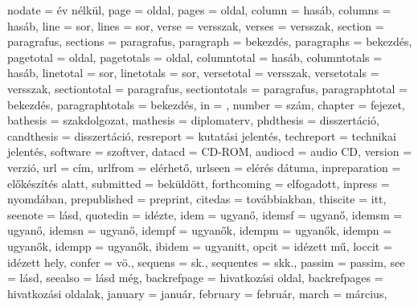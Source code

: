 {		nodate           = {\'ev n\'elk\"ul},
		page             = {oldal},
		pages            = {oldal},
		column           = {has\'ab},
		columns          = {has\'ab},
		line             = {sor},
		lines            = {sor},
		verse            = {versszak},
		verses           = {versszak},
		section          = {paragrafus},
		sections         = {paragrafus},
		paragraph        = {bekezd\'es},
		paragraphs       = {bekezd\'es},
		pagetotal        = {oldal},
		pagetotals       = {oldal},
		columntotal      = {has\'ab},
		columntotals     = {has\'ab},
		linetotal        = {sor},
		linetotals       = {sor},
		versetotal       = {versszak},
		versetotals      = {versszak},
		sectiontotal     = {paragrafus},
		sectiontotals    = {paragrafus},
		paragraphtotal   = {bekezd\'es},
		paragraphtotals  = {bekezd\'es},
		in               = {},
		number           = {sz\'am},
		chapter          = {fejezet},
		bathesis         = {szakdolgozat},
		mathesis         = {diplomaterv},
		phdthesis        = {disszert\'aci\'o},
		candthesis       = {disszert\'aci\'o},
		resreport        = {kutat\'asi jelent\'es},
		techreport       = {technikai jelent\'es},
		software         = {szoftver},
		datacd           = {CD-ROM},
		audiocd          = {audio CD},
		version          = {verzi\'o},
		url              = {c\'im},
		urlfrom          = {el\'erhet\H{o}},
		urlseen          = {el\'er\'es d\'atuma},
		inpreparation    = {el\H{o}k\'esz\'it\'es alatt},
		submitted        = {bek\"uld\"ott},
		forthcoming      = {elfogadott},
		inpress          = {nyomd\'aban},
		prepublished     = {preprint},
		citedas          = {tov\'abbiakban},
		thiscite         = {itt},
		seenote          = {l\'asd},
		quotedin         = {id\'ezte},
		idem             = {ugyan\H{o}},
		idemsf           = {ugyan\H{o}},
		idemsm           = {ugyan\H{o}},
		idemsn           = {ugyan\H{o}},
		idempf           = {ugyan\H{o}k},
		idempm           = {ugyan\H{o}k},
		idempn           = {ugyan\H{o}k},
		idempp           = {ugyan\H{o}k},
		ibidem           = {ugyanitt},
		opcit            = {id\'ezett m\H{u}},
		loccit           = {id\'ezett hely},
		confer           = {v\"o\adddot},
		sequens          = {sk\adddot},
		sequentes        = {skk\adddot},
		passim           = {passim},
		see              = {l\'asd},
		seealso          = {l\'asd m\'eg},
		backrefpage      = {hivatkoz\'asi oldal},
		backrefpages     = {hivatkoz\'asi oldalak},
		january          = {janu\'ar},
		february         = {febru\'ar},
		march            = {m\'arcius},
}
